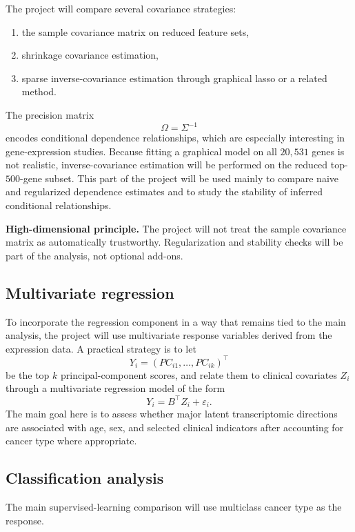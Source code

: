 \documentclass[12pt]{article}
\newcommand{\1}{\mathbf{1}}
\begin{document}
The project will compare several covariance strategies:
\begin{enumerate}
    \item the sample covariance matrix on reduced feature sets,
    \item shrinkage covariance estimation,
    \item sparse inverse-covariance estimation through graphical lasso or a related method.
\end{enumerate}

The precision matrix
\[
\Omega = \Sigma^{-1}
\]
encodes conditional dependence relationships, which are especially interesting in gene-expression studies. Because fitting a graphical model on all \(20{,}531\) genes is not realistic, inverse-covariance estimation will be performed on the reduced top-\(500\)-gene subset. This part of the project will be used mainly to compare naive and regularized dependence estimates and to study the stability of inferred conditional relationships.

\begin{defbox}
\textbf{High-dimensional principle.}
The project will not treat the sample covariance matrix as automatically trustworthy. Regularization and stability checks will be part of the analysis, not optional add-ons.
\end{defbox}

\subsection{Multivariate regression}

To incorporate the regression component in a way that remains tied to the main analysis, the project will use multivariate response variables derived from the expression data. A practical strategy is to let
\[
Y_i = {(PC_{i1},\dots,PC_{ik})}^\top
\]
be the top \(k\) principal-component scores, and relate them to clinical covariates \(Z_i\) through a multivariate regression model of the form
\[
Y_i = B^\top Z_i + \varepsilon_i.
\]
The main goal here is to assess whether major latent transcriptomic directions are associated with age, sex, and selected clinical indicators after accounting for cancer type where appropriate.

\subsection{Classification analysis}

The main supervised-learning comparison will use multiclass cancer type as the response.
\end{document}
